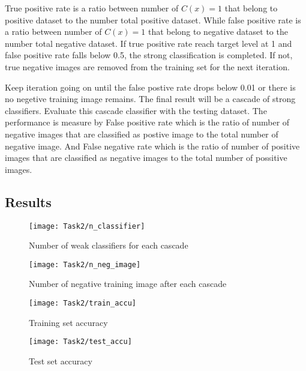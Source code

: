 \documentclass[11pt]{article}
\begin{document}
True positive rate is a ratio between number of $C(x) = 1$ that belong to positive dataset to the number total positive dataset. While false positive rate is a ratio between number of $C(x) = 1$ that belong to negative dataset to the number total negative dataset. If true positive rate reach target level at 1 and false positive rate falls below 0.5, the strong classification is completed. If not, true negative images are removed from the training set for the next iteration.

Keep iteration going on until the false postive rate drops below 0.01 or there is no negetive training image remains. The final result will be a cascade of strong classifiers. Evaluate this cascade classifier with the testing dataset. The performance is measure by False positive rate which is the ratio of number of negative images that are classified as postive image to the total number of negative image. And False negative rate which is the ratio of number of positive images that are classified as negative images to the total number of possitive images.






\subsection*{Results}

\begin{figure}[H]
\centering
\texttt{[image: Task2/n\_classifier]}
\caption{Number of weak classifiers for each cascade}
\label{}
\end{figure}

\begin{figure}[H]
\centering
\texttt{[image: Task2/n\_neg\_image]}
\caption{Number of negative training image after each cascade}
\label{}
\end{figure}

\begin{figure}[H]
\centering
\texttt{[image: Task2/train\_accu]}
\caption{Training set accuracy}
\label{}
\end{figure}

\begin{figure}[H]
\centering
\texttt{[image: Task2/test\_accu]}
\caption{Test set accuracy}
\label{}
\end{figure}
\end{document}
